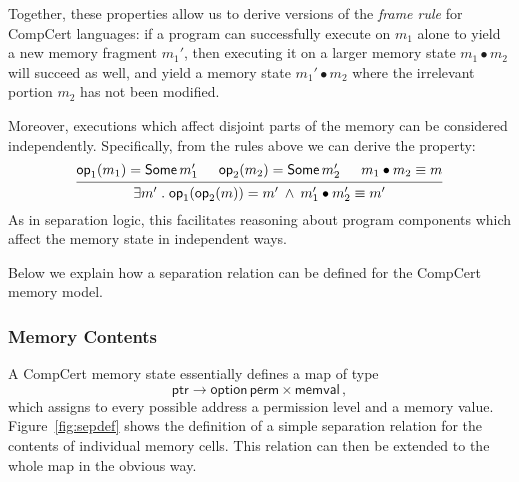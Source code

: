 \documentclass[acmsmall,screen,review,anonymous]{acmart}
\newcommand{\kw}[1]{\ensuremath{ \mathsf{#1} }}
\begin{document}
Together,
these properties allow us to derive
versions of the \emph{frame rule}
for CompCert languages:
if a program can successfully execute on $m_1$ alone
to yield a new memory fragment $m_1'$,
then executing it on a larger memory state
$m_1 \bullet m_2$ will succeed as well,
and yield a memory state $m_1' \bullet m_2$
where the irrelevant portion $m_2$
has not been modified.

Moreover,
executions which affect disjoint parts of the memory
can be considered independently.
Specifically, from the rules above
we can derive the property:
\[
  \begin{prooftree}
    \hypo{\kw{op}_1(m_1) = \kw{Some}\,m_1'}
    \hypo{\kw{op}_2(m_2) = \kw{Some}\,m_2'}
    \hypo{m_1 \bullet m_2 \equiv m}
    \infer3{\exists m' \mathrel.
      \kw{op}_1(\kw{op}_2(m)) =
	m' \:\wedge\:
      m_1' \bullet m_2' \equiv m'}
  \end{prooftree}
\]
As in separation logic,
this facilitates reasoning
about program components
which affect the memory state in independent ways.

Below we explain how a separation relation can be defined
for the CompCert memory model.

\subsubsection{Memory Contents}

A CompCert memory state essentially defines a map of type
\[
  \kw{ptr} \rightarrow \kw{option}\,\kw{perm} \times \kw{memval} \,,
\]
which assigns to every possible address
a permission level and a memory value.
Figure~\ref{fig:sepdef}
shows the definition of a simple separation relation
for the contents of individual memory cells.
This relation can then be extended to the whole map
in the obvious way.
\end{document}
